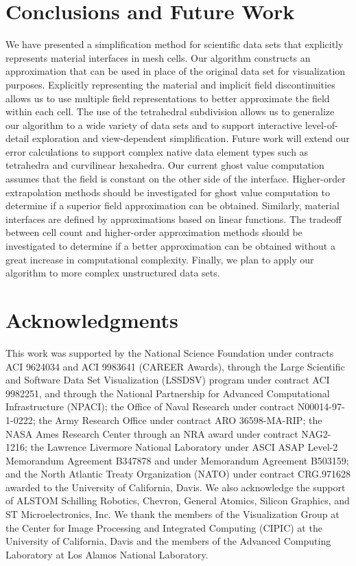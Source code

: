 \documentclass{siggraph}
\begin{document}
\section {Conclusions and Future Work}
We have presented a simplification method for scientific data sets
that explicitly represents material interfaces in mesh cells.  Our
algorithm constructs an approximation that can be used in place of the
original data set for visualization purposes.  Explicitly representing
the material and implicit field discontinuities allows us to use
multiple field representations to better approximate the field within
each cell.  The use of the tetrahedral subdivision allows us to
generalize our algorithm to a wide variety of data sets and to support
interactive level-of-detail exploration and view-dependent
simplification.  Future work will extend our error calculations to
support complex native data element types such as tetrahedra and
curvilinear hexahedra.  Our current ghost value computation assumes
that the field is constant on the other side of the interface.
Higher-order extrapolation methods should be investigated for ghost
value computation to determine if a superior field approximation can
be obtained.  Similarly, material interfaces are defined by
approximations based on linear functions.  The tradeoff between cell
count and higher-order approximation methods should be investigated to
determine if a better approximation can be obtained without a great
increase in computational complexity.  Finally, we plan to apply our
algorithm to more complex unstructured data sets.


\section {Acknowledgments}
This work was supported by
the National Science Foundation under contracts
    ACI 9624034 and ACI 9983641 (CAREER Awards),
    through the Large Scientific and Software Data Set Visualization
(LSSDSV)
    program under contract ACI 9982251,
    and through the National Partnership for Advanced Computational
    Infrastructure (NPACI);
the Office of Naval Research under contract N00014-97-1-0222;
the Army Research Office under contract ARO 36598-MA-RIP;
the NASA Ames Research Center through an NRA award
    under contract NAG2-1216;
the Lawrence Livermore National Laboratory under ASCI ASAP Level-2
    Memorandum Agreement B347878 and under Memorandum Agreement B503159;
and the North Atlantic Treaty Organization (NATO)
    under contract CRG.971628
awarded to the University of California, Davis.
We also acknowledge the support of ALSTOM Schilling Robotics,
Chevron, General Atomics, Silicon Graphics, and
ST Microelectronics, Inc.
We thank the members of the Visualization Group at the
Center for Image Processing and Integrated Computing (CIPIC)
at the University of California, Davis and the members of
the Advanced Computing Laboratory at Los Alamos National Laboratory.



\noindent

%

\end{document}
